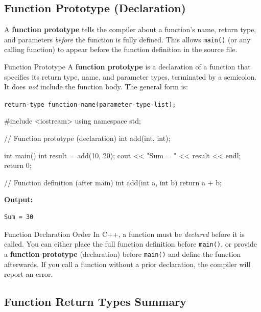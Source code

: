 \subsection{Function Prototype (Declaration)}
\label{subsec:function-prototype}

A \textbf{function prototype} tells the compiler about a function's name,
return type, and parameters \emph{before} the function is fully defined. This
allows \texttt{main()} (or any calling function) to appear before the function
definition in the source file.

\begin{definitionbox}{Function Prototype}
A \textbf{function prototype} is a declaration of a function that specifies its
return type, name, and parameter types, terminated by a semicolon.
It does \emph{not} include the function body. The general form is:

\medskip
\texttt{return-type function-name(parameter-type-list);}
\end{definitionbox}

\begin{cppcode}
#include <iostream>
using namespace std;

// Function prototype (declaration)
int add(int, int);

int main()
{
    int result = add(10, 20);
    cout << "Sum = " << result << endl;
    return 0;
}

// Function definition (after main)
int add(int a, int b)
{
    return a + b;
}
\end{cppcode}

\noindent\textbf{Output:}
\begin{verbatim}
Sum = 30
\end{verbatim}

\begin{warningbox}{Function Declaration Order}
In C++, a function must be \emph{declared} before it is called. You can either
place the full function definition before \texttt{main()}, or provide a
\textbf{function prototype} (declaration) before \texttt{main()} and define
the function afterwards. If you call a function without a prior declaration,
the compiler will report an error.
\end{warningbox}

\subsection{Function Return Types Summary}

